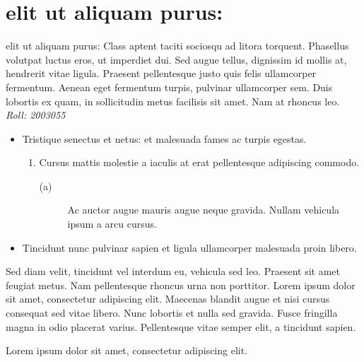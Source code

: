 \documentclass[12pt,a4paper]{article}
\begin{document}
\section[1]{elit ut aliquam purus:}
elit ut aliquam purus: Class aptent taciti sociosqu ad litora torquent.
Phasellus volutpat luctus eros, ut imperdiet dui. 
Sed augue tellus, dignissim id mollis at, hendrerit vitae ligula. 
Praesent pellentesque justo quis felis ullamcorper fermentum. 
Aenean eget fermentum turpis, pulvinar ullamcorper sem. 
Duis lobortis ex quam, in sollicitudin metus facilisis sit amet. Nam at rhoncus leo.
\newline
\emph{Roll: 2003055}
\begin{itemize}
    \item Tristique senectus et netus: et malesuada fames ac turpis egestas.
    \begin{enumerate}
        \item  Cursus mattis molestie a iaculis at erat pellentesque adipiscing commodo.
        \begin{description}
            \item[(a)]Ac auctor augue mauris augue neque gravida. Nullam vehicula ipsum a arcu cursus.
        \end{description}
    \end{enumerate}
    
    \item Tincidunt nunc pulvinar sapien et ligula ullamcorper malesuada proin libero.
\end{itemize}
 

Sed diam velit, tincidunt vel interdum eu, vehicula sed leo. 
Praesent sit amet feugiat metus. Nam pellentesque rhoncus urna non porttitor. 
Lorem ipsum dolor sit amet, consectetur adipiscing elit. 
Maecenas blandit augue et nisi cursus consequat sed vitae libero. 
Nunc lobortis et nulla sed gravida. Fusce fringilla magna in odio placerat varius. 
Pellentesque vitae semper elit, a tincidunt sapien. 
\begin{flushright}
    Lorem ipsum dolor sit amet, consectetur adipiscing elit.
\end{flushright}
\end{document}
